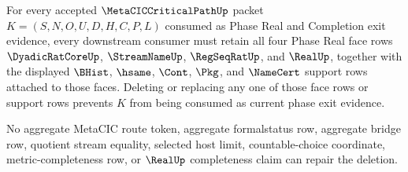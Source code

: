 \begin{theorem}
\label{thm:metacic-critical-path-phase-real-consumer-minimality}
For every accepted $\MetaCICCriticalPathUp$ packet $K=(S,N,O,U,D,H,C,P,L)$ consumed as Phase Real and Completion exit evidence, every downstream consumer must retain all four Phase Real face rows $\DyadicRatCoreUp$, $\StreamNameUp$, $\RegSeqRatUp$, and $\RealUp$, together with the displayed $\BHist$, $\hsame$, $\Cont$, $\Pkg$, and $\NameCert$ support rows attached to those faces. Deleting or replacing any one of those face rows or support rows prevents $K$ from being consumed as current phase exit evidence.

No aggregate MetaCIC route token, aggregate formalstatus row, aggregate bridge row, quotient stream equality, selected host limit, countable-choice coordinate, metric-completeness row, or $\RealUp$ completeness claim can repair the deletion.
\end{theorem}
